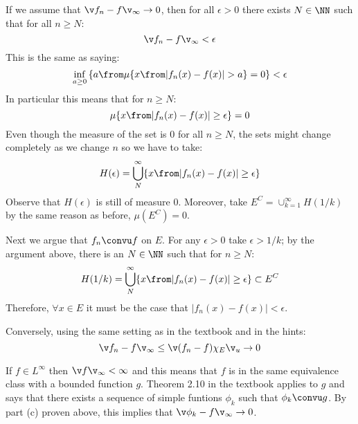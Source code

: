 If we assume that $\v f_n - f\v_\infty\to 0$, then for all $\epsilon>0$ there exists $N\in \NN $ such that for all $n\geq N$:
$$\v f_n - f\v_\infty < \epsilon$$
This is the same as saying:
$$\inf_{a\geq 0}\left \{ a\from \mu\{ x\from | f_n(x) - f(x)| > a\}=0\right\}<\epsilon$$
In particular this means that for $n\geq N$:
$$\mu\{ x\from |f_n(x) - f(x)|\geq  \epsilon \}=0$$
Even though the measure of the set is 0 for all $n\geq N$, the sets might change completely as we change $n$ so we have to take:
$$H(\epsilon) =\bigcup_N^\infty  \{ x\from |f_n(x) - f(x)|\geq  \epsilon \}$$
Observe that $H(\epsilon)$ is still of measure 0. 
Moreover, take $E^C = \cup_{k=1}^\infty H(1/k)$ by the same reason as before, $\mu(E^C)=0$.

Next we argue that $f_n\convu f$ on $E$. 
For any $\epsilon >0$ take $\epsilon > 1/k$; by the argument above, there is an $N\in \NN$ such that for $n\geq N$:
$$H(1/k)= \bigcup_N^\infty  \{ x\from |f_n(x) - f(x)|\geq  \epsilon \}\subset E^C$$
Therefore, $\forall x\in E$ it must be the case that $|f_n(x) -f(x)| < \epsilon$.

Conversely, using the same setting as in the textbook and in the hints:
$$\v f_n -f\v_\infty \leq \v (f_n -f) \chi_E\v_u\to 0$$ 

If $f\in L^\infty$ then $\v f\v_\infty <\infty$ and this means that $f$ is in the same equivalence class with a bounded function $g$. Theorem 2.10 in the textbook applies to $g$ and says that there exists a sequence of simple funtions $\phi_k$ such that $\phi_k \convu g$. By part (c) proven above, this implies that $\v \phi_k - f\v_\infty\to 0$.
